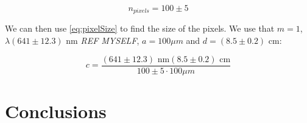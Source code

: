 \documentclass{emulateapj}
\begin{document}
\begin{equation}
n_{pixels} = 100\pm 5
\end{equation}

We can then use \eqref{eq:pixelSize} to find the size of the pixels. We use that $m = 1$, $\lambda (641 \pm 12.3)$ nm \emph{REF MYSELF}, $a = 100 \mu m$ and $d = (8.5 \pm 0.2)$ cm:

\begin{equation}
c =  \frac{(641 \pm 12.3) \text{ nm} (8.5 \pm 0.2) \text{ cm}}{100\pm 5 \cdot100 \mu m}
\end{equation}










\section{Conclusions}
\label{sec:conclusions}
\end{document}
